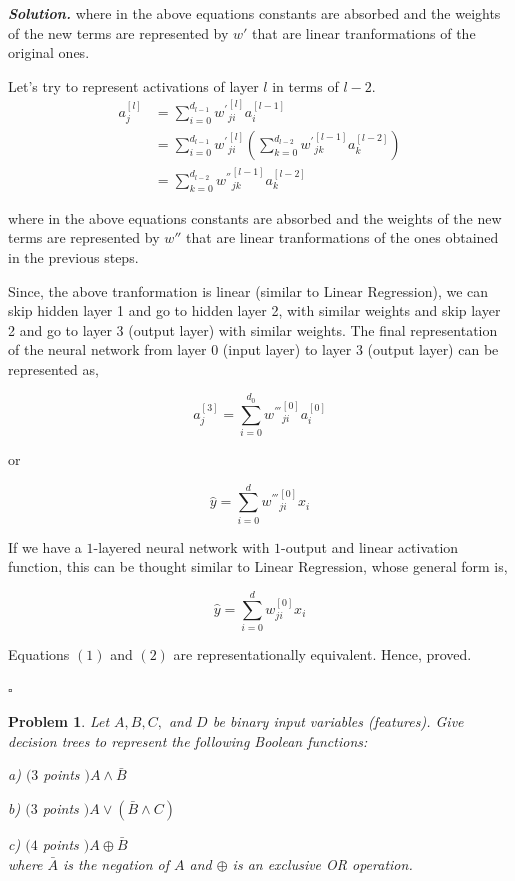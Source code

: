 \documentclass[10pt]{article}
\newtheorem{problem}{Problem}
\newenvironment{solution}[1][\it{Solution}]{\textbf{#1. } }{$\square$}
\begin{document}
\begin{solution}
where in the above equations constants are absorbed and the weights of the new terms are represented by $w{'}$ that are linear tranformations of the original ones.

Let's try to represent activations of layer $l$ in terms of $l - 2$.
\begin{align*}
a^{[l]}_{j} &= \sum_{i = 0}^{d_{l-1}} {w^{'}}^{[l]}_{ji}a^{[l-1]}_{i}\\
			  &= \sum_{i = 0}^{d_{l-1}} {w^{'}}^{[l]}_{ji}\left(\sum_{k = 0}^{d_{l-2}} {w^{'}}^{[l-1]}_{jk}a^{[l-2]}_{k}\right)\\
			  &= \sum_{k = 0}^{d_{l-2}} {w^{''}}^{[l-1]}_{jk}a^{[l-2]}_{k}
\end{align*}

where in the above equations constants are absorbed and the weights of the new terms are represented by $w{''}$ that are linear tranformations of the ones obtained in the previous steps.

Since, the above tranformation is linear (similar to Linear Regression), we can skip hidden layer 1 and go to hidden layer 2, with similar weights and skip layer 2 and go to layer 3 (output layer) with similar weights. The final representation of the neural network from layer 0 (input layer) to layer 3 (output layer) can be represented as,

$$
a^{[3]}_{j} = \sum_{i = 0}^{d_0} {w^{'''}}^{[0]}_{ji}a^{[0]}_{i}
$$

or

\begin{equation}
\hat{y} = \sum_{i = 0}^{d} {w^{'''}}^{[0]}_{ji}x_{i}
\end{equation}

If we have a $1$-layered neural network with $1$-output and linear activation function, this can be thought similar to Linear Regression, whose general form is,

\begin{equation}
\hat{y} = \sum_{i = 0}^{d} {w}^{[0]}_{ji}x_{i}
\end{equation}

Equations $(1)$ and $(2)$ are representationally equivalent. Hence, proved.

\end{solution}



\begin{problem}
Let $A, B, C,$ and $D$ be binary input variables (features). Give decision trees to represent the following Boolean functions:

a) $(3$ points $) A \wedge \bar{B}$

b) $(3$ points $) A \vee(\bar{B} \wedge C)$

c) $(4$ points $) A \oplus \bar{B}$\\
where $\bar{A}$ is the negation of $A$ and $\oplus$ is an exclusive OR operation.
\end{problem}
\end{document}
